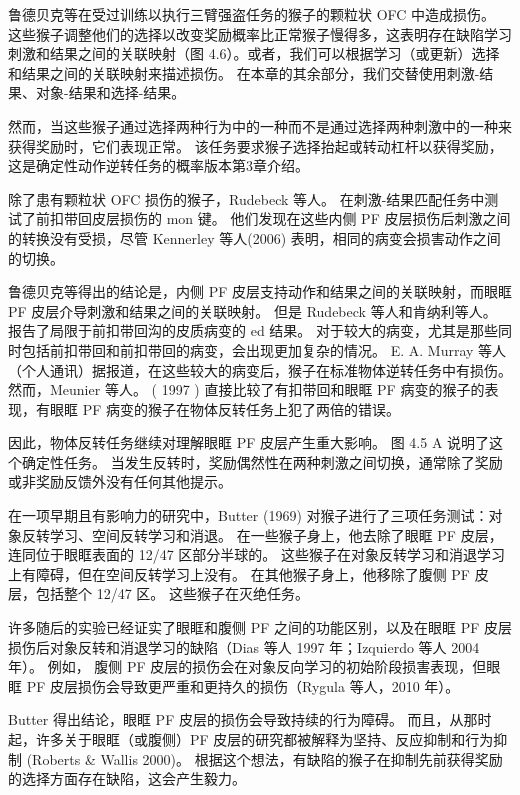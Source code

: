 鲁德贝克等在受过训练以执行三臂强盗任务的猴子的颗粒状 OFC 中造成损伤。 这些猴子调整他们的选择以改变奖励概率比正常猴子慢得多，这表明存在缺陷学习刺激和结果之间的关联映射（图 4.6）。或者，我们可以根据学习（或更新）选择和结果之间的关联映射来描述损伤。 在本章的其余部分，我们交替使用刺激-结果、对象-结果和选择-结果。\par
然而，当这些猴子通过选择两种行为中的一种而不是通过选择两种刺激中的一种来获得奖励时，它们表现正常。 该任务要求猴子选择抬起或转动杠杆以获得奖励，这是确定性动作逆转任务的概率版本第3章介绍。\par
除了患有颗粒状 OFC 损伤的猴子，Rudebeck 等人。 在刺激-结果匹配任务中测试了前扣带回皮层损伤的 mon 键。 他们发现在这些内侧 PF 皮层损伤后刺激之间的转换没有受损，尽管 Kennerley 等人(2006) 表明，相同的病变会损害动作之间的切换。\par
鲁德贝克等得出的结论是，内侧 PF 皮层支持动作和结果之间的关联映射，而眼眶 PF 皮层介导刺激和结果之间的关联映射。 但是 Rudebeck 等人和肯纳利等人。 报告了局限于前扣带回沟的皮质病变的 ed 结果。 对于较大的病变，尤其是那些同时包括前扣带回和前扣带回的病变，会出现更加复杂的情况。 E. A. Murray 等人（个人通讯）据报道，在这些较大的病变后，猴子在标准物体逆转任务中有损伤。 然而，Meunier 等人。 ( 1997 ) 直接比较了有扣带回和眼眶 PF 病变的猴子的表现，有眼眶 PF 病变的猴子在物体反转任务上犯了两倍的错误。  \par
因此，物体反转任务继续对理解眼眶 PF 皮层产生重大影响。 图 4.5 A 说明了这个确定性任务。 当发生反转时，奖励偶然性在两种刺激之间切换，通常除了奖励或非奖励反馈外没有任何其他提示。\par
在一项早期且有影响力的研究中，Butter (1969) 对猴子进行了三项任务测试：对象反转学习、空间反转学习和消退。 在一些猴子身上，他去除了眼眶 PF 皮层，连同位于眼眶表面的 12/47 区部分半球的。 这些猴子在对象反转学习和消退学习上有障碍，但在空间反转学习上没有。 在其他猴子身上，他移除了腹侧 PF 皮层，包括整个 12/47 区。 这些猴子在灭绝任务。\par
许多随后的实验已经证实了眼眶和腹侧 PF 之间的功能区别，以及在眼眶 PF 皮层损伤后对象反转和消退学习的缺陷（Dias 等人 1997 年；Izquierdo 等人 2004 年）。 例如，
腹侧 PF 皮层的损伤会在对象反向学习的初始阶段损害表现，但眼眶 PF 皮层损伤会导致更严重和更持久的损伤（Rygula 等人，2010 年）。\par
 Butter 得出结论，眼眶 PF 皮层的损伤会导致持续的行为障碍。 而且，从那时起，许多关于眼眶（或腹侧）PF 皮层的研究都被解释为坚持、反应抑制和行为抑制 (Roberts \& Wallis 2000)。 根据这个想法，有缺陷的猴子在抑制先前获得奖励的选择方面存在缺陷，这会产生毅力。\par
